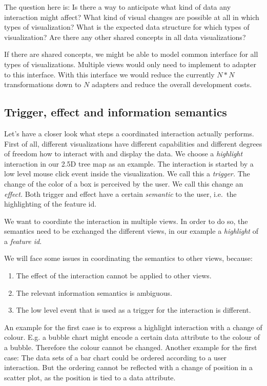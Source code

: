 \documentclass{article}
\newcommand{\tmap}{\textsc{2.5D} tree map}
\begin{document}
The question here is:
Is there a way to anticipate what kind of data any interaction might affect?
What kind of visual changes are possible at all in which types of visualization?
What is the expected data structure for which types of visualization?
Are there any other shared concepts in all data visualizations?

If there are shared concepts, we might be able to model common interface for all types of visualizations.
Multiple views would only need to implement to adapter to this interface.
With this interface we would reduce the currently $N*N$ transformations down to $N$ adapters and reduce the overall development costs.

\subsection{Trigger, effect and information semantics}

Let's have a closer look what steps a coordinated interaction actually performs.
First of all, different visualizations have different capabilities and different degrees of freedom how to interact with and display the data.
We choose a \emph{highlight} interaction in our \tmap{} as an example.
The interaction is started by a low level mouse click event inside the visualization.
We call this a \emph{trigger.}
The change of the color of a box is perceived by the user. 
We call this change an \emph{effect.}
Both trigger and effect have a certain \emph{semantic} to the user, i.e.\ the highlighting of the feature id.

We want to coordinte the interaction in multiple views.
In order to do so, the semantics need to be exchanged the different views, in our example a \emph{highlight} of a \emph{feature id}.

We will face some issues in coordinating the semantics to other views, because:
\begin{enumerate}
    \item
        The effect of the interaction cannot be applied to other views.
    \item 
        The relevant information semantics is ambiguous.
    \item 
        The low level event that is used as a trigger for the interaction is different.
\end{enumerate}
An example for the first case is to express a highlight interaction with a change of colour.
E.g. a bubble chart might encode a certain data attribute to the colour of a bubble.
Therefore the colour cannot be changed.
Another example for the first case:
The data sets of a bar chart could be ordered according to a user interaction.
But the ordering cannot be reflected with a change of position in a scatter plot, as the position is tied to a data attribute.
\end{document}

